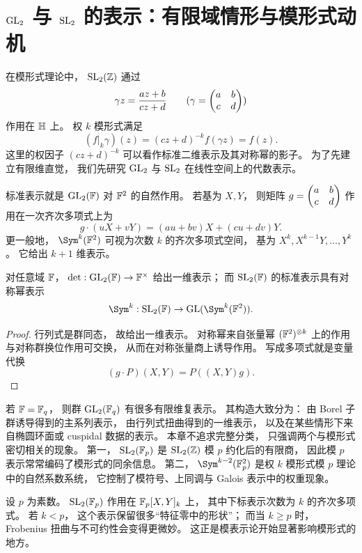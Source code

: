 \section{$\mathrm{GL}_2$ 与 $\mathrm{SL}_2$ 的表示：有限域情形与模形式动机}
在模形式理论中， $\mathrm{SL}_2(\mathbb{Z})$ 通过
\[
\gamma z=\frac{az+b}{cz+d}
\qquad
(\gamma=\begin{pmatrix} a&b\\ c&d \end{pmatrix})
\]
作用在 $\mathbb{H}$ 上。 权 $k$ 模形式满足
\[
(f|_k\gamma)(z)=(cz+d)^{-k}f(\gamma z)=f(z).
\]
这里的权因子 $(cz+d)^{-k}$ 可以看作标准二维表示及其对称幂的影子。 为了先建立有限维直觉， 我们先研究 $\mathrm{GL}_2$ 与 $\mathrm{SL}_2$ 在线性空间上的代数表示。
\begin{example}
标准表示就是 $\mathrm{GL}_2(\mathbb{F})$ 对 $\mathbb{F}^2$ 的自然作用。 若基为 $X,Y$， 则矩阵 $g=\begin{pmatrix} a&b\\ c&d \end{pmatrix}$ 作用在一次齐次多项式上为
\[
g\cdot (uX+vY)=(au+bv)X+(cu+dv)Y.
\]
更一般地， $\Sym^k(\F^2)$ 可视为次数 $k$ 的齐次多项式空间， 基为 $X^k,X^{k-1}Y,\dots,Y^k$。 它给出 $k+1$ 维表示。
\end{example}
\begin{proposition}
对任意域 $\mathbb{F}$， $\det: \mathrm{GL}_2(\mathbb{F})\to \mathbb{F}^\times$ 给出一维表示； 而 $\mathrm{SL}_2(\mathbb{F})$ 的标准表示具有对称幂表示
\[
\Sym^k: \SL_2(\F)\to \GL(\Sym^k(\F^2)).
\]
\end{proposition}
\begin{proof}
行列式是群同态， 故给出一维表示。 对称幂来自张量幂 $(\mathbb{F}^2)^{\otimes k}$ 上的作用与对称群换位作用可交换， 从而在对称张量商上诱导作用。 写成多项式就是变量代换
\[
(g\cdot P)(X,Y)=P((X,Y)g).
\]
\end{proof}
若 $\mathbb{F}=\mathbb{F}_q$， 则群 $\mathrm{GL}_2(\mathbb{F}_q)$ 有很多有限维复表示。 其构造大致分为： 由 Borel 子群诱导得到的主系列表示， 由行列式扭曲得到的一维表示， 以及在某些情形下来自椭圆环面或 cuspidal 数据的表示。 本章不追求完整分类， 只强调两个与模形式密切相关的现象。 第一， $\mathrm{SL}_2(\mathbb{F}_p)$ 是 $\mathrm{SL}_2(\mathbb{Z})$ 模 $p$ 约化后的有限商， 因此模 $p$ 表示常常编码了模形式的同余信息。 第二， $\Sym^{k-2}(\F_p^2)$ 是权 $k$ 模形式模 $p$ 理论中的自然系数系统， 它控制了模符号、上同调与 Galois 表示中的权重现象。
\begin{example}
设 $p$ 为素数。 $\mathrm{SL}_2(\mathbb{F}_p)$ 作用在 $\mathbb{F}_p[X,Y]_{k}$ 上， 其中下标表示次数为 $k$ 的齐次多项式。 若 $k<p$， 这个表示保留很多“特征零中的形状”； 而当 $k\ge p$ 时， Frobenius 扭曲与不可约性会变得更微妙。 这正是模表示论开始显著影响模形式的地方。
\end{example}

